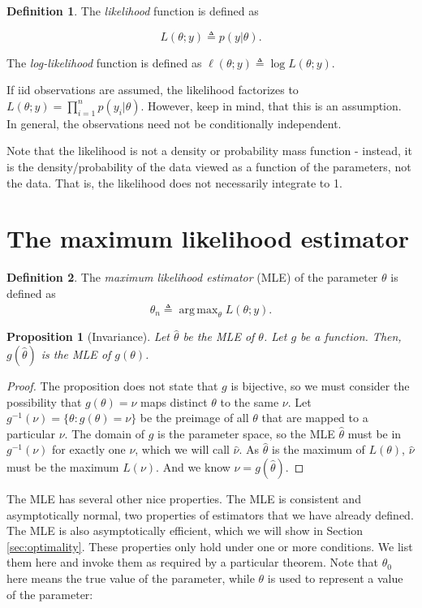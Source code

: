\documentclass{book}
\theoremstyle{plain}%
\newtheorem{proposition}{Proposition}[section]
\theoremstyle{definition}
\newtheorem{definition}{Definition}[section]
\DeclareMathOperator*{\argmax}{arg\,max}
\begin{document}
\begin{definition} The \emph{likelihood} function is defined as

$$L(\theta;y) \triangleq p(y|\theta).$$

The \emph{log-likelihood} function is defined as  $\ell(\theta;y) \triangleq \log L(\theta;y)$.
\end{definition}

If iid observations are assumed, the likelihood factorizes to $L(\theta;y) = \prod_{i=1}^n p(y_i|\theta)$. However, keep in mind, that this is an assumption. In general, the observations need not be conditionally independent.

Note that the likelihood is not a density or probability mass function - instead, it is the density/probability of the data viewed as a function of the parameters, not the data. That is, the likelihood does not necessarily integrate to 1.

\section{The maximum likelihood estimator}

\begin{definition}
The \textit{maximum likelihood estimator} (MLE) of the parameter $\theta$ is defined as $$\hat{\theta}_n \triangleq \displaystyle\argmax_\theta L(\theta;y).$$
\end{definition}

\begin{proposition}[Invariance]
Let $\hat{\theta}$ be the MLE of $\theta$. Let $g$ be a function. Then, $g(\hat{\theta})$ is the MLE of $g(\theta)$.
\end{proposition}

\begin{proof}
The proposition does not state that $g$ is bijective, so we must consider the possibility that $g(\theta) = \nu$ maps distinct $\theta$ to the same $\nu$. Let $g^{-1}(\nu) = \{\theta: g(\theta) = \nu\}$ be the preimage of all $\theta$ that are mapped to a particular $\nu$. The domain of $g$ is the parameter space, so the MLE $\hat{\theta}$ must be in $g^{-1}(\nu)$ for exactly one $\nu$, which we will call $\hat{\nu}$. As $\hat{\theta}$ is the maximum of $L(\theta)$, $\hat{\nu}$ must be the maximum $L(\nu)$. And we know $\hat{\nu} = g(\hat{\theta})$.
\end{proof}

The MLE has several other nice properties. The MLE is consistent and asymptotically normal, two properties of estimators that we have already defined. The MLE is also asymptotically efficient, which we will show in Section \ref{sec:optimality}. These properties only hold under one or more conditions. We list them here and invoke them as required by a particular theorem. Note that $\theta_0$ here means the true value of the parameter, while $\theta$ is used to represent a value of the parameter:
\end{document}

